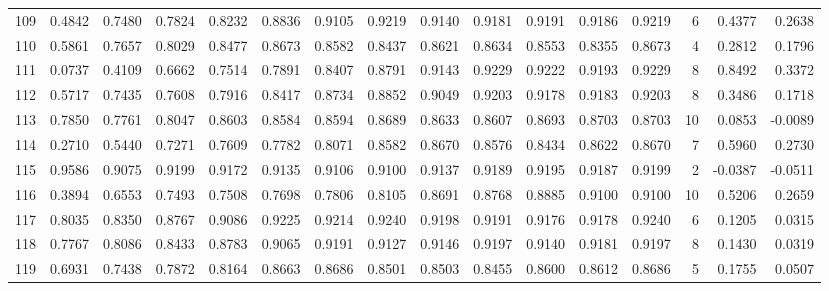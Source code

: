 \begin{tabular}{lrrrrrrrrrrrrrrr}
109 &      0.4842 &  0.7480 &  0.7824 &  0.8232 &  0.8836 &  0.9105 &  0.9219 &  0.9140 &  0.9181 &  0.9191 &   0.9186 &     0.9219 &      6 &                    0.4377 &                     0.2638 \\
110 &      0.5861 &  0.7657 &  0.8029 &  0.8477 &  0.8673 &  0.8582 &  0.8437 &  0.8621 &  0.8634 &  0.8553 &   0.8355 &     0.8673 &      4 &                    0.2812 &                     0.1796 \\
111 &      0.0737 &  0.4109 &  0.6662 &  0.7514 &  0.7891 &  0.8407 &  0.8791 &  0.9143 &  0.9229 &  0.9222 &   0.9193 &     0.9229 &      8 &                    0.8492 &                     0.3372 \\
112 &      0.5717 &  0.7435 &  0.7608 &  0.7916 &  0.8417 &  0.8734 &  0.8852 &  0.9049 &  0.9203 &  0.9178 &   0.9183 &     0.9203 &      8 &                    0.3486 &                     0.1718 \\
113 &      0.7850 &  0.7761 &  0.8047 &  0.8603 &  0.8584 &  0.8594 &  0.8689 &  0.8633 &  0.8607 &  0.8693 &   0.8703 &     0.8703 &     10 &                    0.0853 &                    -0.0089 \\
114 &      0.2710 &  0.5440 &  0.7271 &  0.7609 &  0.7782 &  0.8071 &  0.8582 &  0.8670 &  0.8576 &  0.8434 &   0.8622 &     0.8670 &      7 &                    0.5960 &                     0.2730 \\
115 &      0.9586 &  0.9075 &  0.9199 &  0.9172 &  0.9135 &  0.9106 &  0.9100 &  0.9137 &  0.9189 &  0.9195 &   0.9187 &     0.9199 &      2 &                   -0.0387 &                    -0.0511 \\
116 &      0.3894 &  0.6553 &  0.7493 &  0.7508 &  0.7698 &  0.7806 &  0.8105 &  0.8691 &  0.8768 &  0.8885 &   0.9100 &     0.9100 &     10 &                    0.5206 &                     0.2659 \\
117 &      0.8035 &  0.8350 &  0.8767 &  0.9086 &  0.9225 &  0.9214 &  0.9240 &  0.9198 &  0.9191 &  0.9176 &   0.9178 &     0.9240 &      6 &                    0.1205 &                     0.0315 \\
118 &      0.7767 &  0.8086 &  0.8433 &  0.8783 &  0.9065 &  0.9191 &  0.9127 &  0.9146 &  0.9197 &  0.9140 &   0.9181 &     0.9197 &      8 &                    0.1430 &                     0.0319 \\
119 &      0.6931 &  0.7438 &  0.7872 &  0.8164 &  0.8663 &  0.8686 &  0.8501 &  0.8503 &  0.8455 &  0.8600 &   0.8612 &     0.8686 &      5 &                    0.1755 &                     0.0507 \\

\end{tabular}
